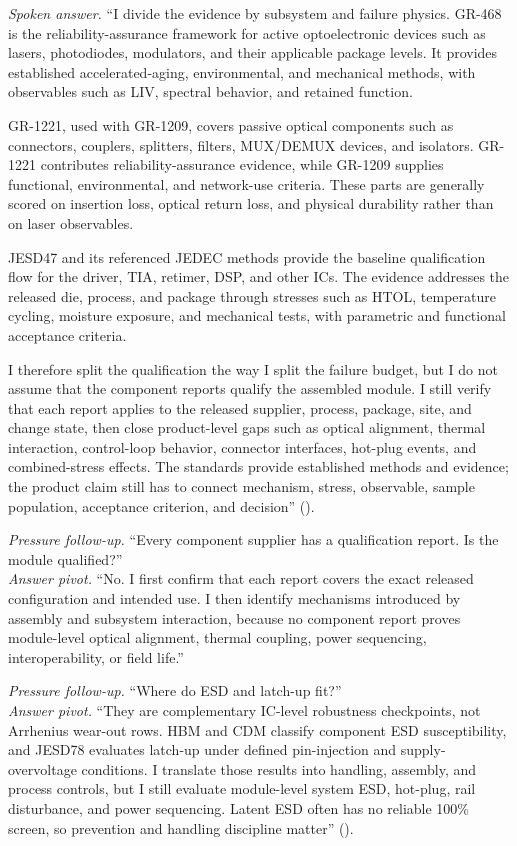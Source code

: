 \textit{Spoken answer.}
``I divide the evidence by subsystem and failure physics. GR-468 is the
reliability-assurance framework for active optoelectronic devices such as
lasers, photodiodes, modulators, and their applicable package levels. It
provides established accelerated-aging, environmental, and mechanical methods,
with observables such as LIV, spectral behavior, and retained function.

GR-1221, used with GR-1209, covers passive optical components such as
connectors, couplers, splitters, filters, MUX/DEMUX devices, and isolators.
GR-1221 contributes reliability-assurance evidence, while GR-1209 supplies
functional, environmental, and network-use criteria. These parts are generally
scored on insertion loss, optical return loss, and physical durability rather
than on laser observables.

JESD47 and its referenced JEDEC methods provide the baseline qualification flow
for the driver, TIA, retimer, DSP, and other ICs. The evidence addresses the
released die, process, and package through stresses such as HTOL, temperature
cycling, moisture exposure, and mechanical tests, with parametric and
functional acceptance criteria.

I therefore split the qualification the way I split the failure budget, but I
do not assume that the component reports qualify the assembled module. I still
verify that each report applies to the released supplier, process, package,
site, and change state, then close product-level gaps such as optical alignment,
thermal interaction, control-loop behavior, connector interfaces, hot-plug
events, and combined-stress effects. The standards provide established methods
and evidence; the product claim still has to connect mechanism, stress,
observable, sample population, acceptance criterion, and decision''
().

\textit{Pressure follow-up.} ``Every component supplier has a qualification
report. Is the module qualified?''\\
\textit{Answer pivot.} ``No. I first confirm that each report covers the exact
released configuration and intended use. I then identify mechanisms introduced
by assembly and subsystem interaction, because no component report proves
module-level optical alignment, thermal coupling, power sequencing,
interoperability, or field life.''

\textit{Pressure follow-up.} ``Where do ESD and latch-up fit?''\\
\textit{Answer pivot.} ``They are complementary IC-level robustness
checkpoints, not Arrhenius wear-out rows. HBM and CDM classify component ESD
susceptibility, and JESD78 evaluates latch-up under defined pin-injection and
supply-overvoltage conditions. I translate those results into handling,
assembly, and process controls, but I still evaluate module-level system ESD,
hot-plug, rail disturbance, and power sequencing. Latent ESD often has no
reliable 100\% screen, so prevention and handling discipline matter''
().

